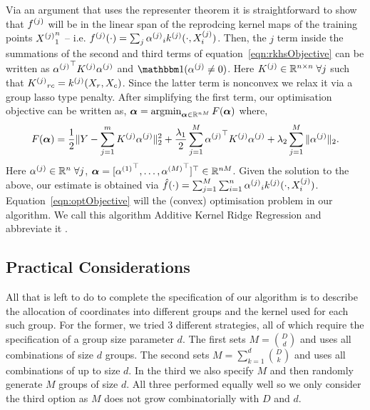 Via an argument that uses the representer theorem it is straightforward to show
that $f^{(j)}$ will be in the linear span of the reprodcing kernel maps of the
training points ${X^{(j)}}_1^n$ -- i.e. $f^{(j)}(\cdot) = 
\sum_j {\alpha^{(j)}}_i k^{(j)}(\cdot, X^{(j)}_i) $.
Then, the $j$ term inside the summations of the second and third
terms of equation~\eqref{eqn:rkhsObjective} can be written as 
${{\alpha^{(j)}}}^\top {K^{(j)}} {\alpha^{(j)}}$ and $\indfone(\alphaj \neq 0)$.
Here ${K^{(j)}} \in \mathbb{R}^{n\times n}\; \forall
j$ such that ${K^{(j)}}_{rc} = k^{(j)}(X_r, X_c)$.
Since the latter term is nonconvex we relax it via a group lasso type penalty.
After simplifying the first term, our optimisation objective can be written as,
${\bm{\alpha}} = \mathop{\mathrm{argmin}}_{{\bm{\alpha}} \in \mathbb{R}^{nM}} F({\bm{\alpha}})$ where,
\begin{equation}
F({\bm{\alpha}}) = \frac{1}{2}\|Y - \sum_{j=1}^m {K^{(j)}} {\alpha^{(j)}}\|_2^2 + 
  \frac{\lambda_1}{2} \sum_{j=1}^M {{\alpha^{(j)}}}^\top {K^{(j)}} {\alpha^{(j)}} +
  \lambda_2 \sum_{j=1}^M \| {\alpha^{(j)}} \|_2.
\label{eqn:optObjective}
\end{equation}
Here ${\alpha^{(j)}} \in \mathbb{R}^n \; \forall j$, ${\bm{\alpha}} = [{\alpha^{(1)}}^\top, \dots, 
{\alpha^{(M)}}^\top]^\top  \in\mathbb{R}^{nM}$. Given the solution to the above, our
estimate is obtained via $\hat{f}(\cdot) = \sum_{j=1}^M \sum_{i=1}^n {\alpha^{(j)}}_i
k^{(j)}(\cdot, X^{(j)}_i)$.
Equation~\eqref{eqn:optObjective} will the (convex) optimisation problem in our
algorithm.
We call this algorithm Additive Kernel Ridge Regression and abbreviate it
\addkrr.

\subsection{Practical Considerations}

All that is left to do to complete the specification of our algorithm is to
describe the allocation of coordinates into different groups and the kernel used
for each such group. For the former, we tried 3 different strategies, all of which
require the specification of a group size parameter $d$. The first sets $M = {D
\choose d}$ and uses all combinations of size $d$ groups. The second sets $M =
\sum_{k=1}^d {D \choose k}$ and uses all combinations of up to size $d$. In the
third we also specify $M$ and then randomly generate $M$ groups of size $d$.
All three performed equally well so we only consider the third option as $M$
does not grow combinatorially with $D$ and $d$.


